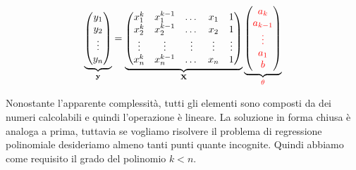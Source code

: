 \documentclass{article}
\begin{document}
        \[
            \underbrace{\begin{pmatrix}
                y_{1}\\
                y_{2} \\
                \vdots \\
                y_{n} \\
            \end{pmatrix}}_\mathbf{y} = \underbrace{\begin{pmatrix}
                x_1^k & x_1^{k-1} & \dots & x_1 & 1 \\
                x_2^k & x_2^{k-1} & \dots & x_2 & 1 \\
                \vdots & \vdots & \vdots & \vdots & \vdots \\
                x_n^k & x_n^{k-1} & \dots & x_n & 1 \\
            \end{pmatrix}}_\mathbf{X}
            \underbrace{\begin{pmatrix}
               \color{red} a_{k}\\
               \color{red}a_{k-1} \\
               \color{red} \vdots \\
               \color{red}a_1 \\
               \color{red}  b
            \end{pmatrix}}_\mathbf{\color{red}\theta} \]

        Nonostante l'apparente complessità, tutti gli elementi sono composti da dei numeri calcolabili e quindi l'operazione è lineare. 
        La soluzione in forma chiusa è analoga a prima, tuttavia se vogliamo risolvere il problema di regressione polinomiale desideriamo 
        almeno tanti punti quante incognite. Quindi abbiamo come requisito il grado del polinomio $k<n$. 
\end{document}
